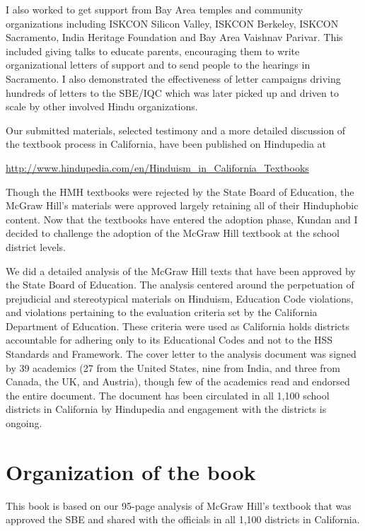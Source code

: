 I also worked to get support from Bay Area temples and community organizations including ISKCON Silicon Valley, ISKCON Berkeley, ISKCON Sacramento, India Heritage Foundation and Bay Area Vaishnav Parivar. This included giving talks to educate parents, encouraging them to write organizational letters of support and to send people to the hearings in Sacramento. I also demonstrated the effectiveness of letter campaigns driving hundreds of letters to the SBE/IQC which was later picked up and driven to scale by other involved Hindu organizations.

Our submitted materials, selected testimony and a more detailed discussion of the textbook process in California, have been published on Hindupedia at 

{\small\url{http://www.hindupedia.com/en/Hinduism_in_California_Textbooks}}

Though the HMH textbooks were rejected by the State Board of Education, the McGraw Hill’s materials were approved largely retaining all of their Hinduphobic content. Now that the textbooks have entered the adoption phase, Kundan and I decided to challenge the adoption of the McGraw Hill textbook at the school district levels. 

We did a detailed analysis of the McGraw Hill texts that have been approved by the State Board of Education. The analysis centered around the perpetuation of prejudicial and stereotypical materials on Hinduism, Education Code violations, and violations pertaining to the evaluation criteria set by the California Department of Education. These criteria were used as California holds districts accountable for adhering only to its Educational Codes and not to the HSS Standards and Framework. The cover letter to the analysis document was signed by 39 academics (27 from the United States, nine from India, and three from Canada, the UK, and Austria), though  few of the academics read and endorsed the entire document. The document has been circulated in all 1,100 school districts in California by Hindupedia and engagement with the districts is ongoing.

\section*{Organization of the book}
\vskip -5pt

This book is based on our 95-page analysis of McGraw Hill’s textbook that was approved the SBE and shared with the officials in all 1,100 districts in California. 

